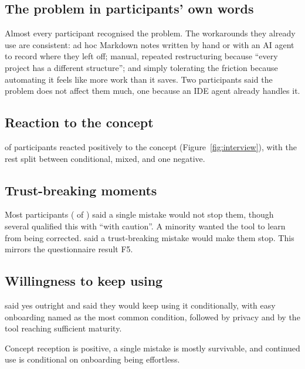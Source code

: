 \documentclass[11pt]{article}
\begin{document}
\subsection{The problem in participants' own words}

Almost every participant recognised the problem. The workarounds they already use are
consistent: ad hoc Markdown notes written by hand or with an AI agent to record where they left
off; manual, repeated restructuring because \enquote{every project has a different structure};
and simply tolerating the friction because automating it feels like more work than it saves.
Two participants said the problem does not affect them much, one because an IDE agent already
handles it.

\subsection{Reaction to the concept}

\IvPositive{} of \Niv{} participants reacted positively to the concept
(Figure~\ref{fig:interview}), with the rest split between conditional, mixed, and one negative.

\subsection{Trust-breaking moments}

Most participants (\IvTrustShrug{} of \Niv{}) said a single mistake would not stop them, though
several qualified this with \enquote{with caution}. A minority wanted the tool to learn from
being corrected. \IvTrustStop{} said a trust-breaking mistake would make them stop. This mirrors
the questionnaire result F5.

\subsection{Willingness to keep using}

\IvKeepYes{} said yes outright and \IvKeepConditional{} said they would keep using it
conditionally, with easy onboarding named as the most common condition, followed by privacy and
by the tool reaching sufficient maturity.

\begin{finding}
Concept reception is positive, a single mistake is mostly survivable, and continued use is
conditional on onboarding being effortless.
\end{finding}
\end{document}
